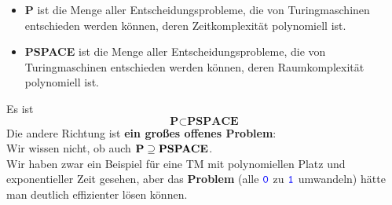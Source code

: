 \begin{frame}
	\begin{Definition}
	\begin{itemize}
		\item \textbf{P} ist die Menge aller Entscheidungsprobleme, die von Turingmaschinen entschieden werden können, deren Zeitkomplexität polynomiell ist.
		\item \textbf{PSPACE} ist die Menge aller Entscheidungsprobleme, die von Turingmaschinen entschieden werden können, deren Raumkomplexität polynomiell ist.
	\end{itemize}
	\end{Definition}
	\pause
	Es ist $$\textbf{P} \subset \textbf{PSPACE}$$ \pause
	Die andere Richtung ist \textbf{ein großes offenes Problem}:\\
	Wir wissen nicht, ob auch \qquad $\textbf{P} \supseteq \text{\bfseries PSPACE}$. \\
	Wir haben zwar ein Beispiel für eine TM mit polynomiellen Platz und exponentieller Zeit gesehen, aber das \textbf{Problem} (alle $\hbox{\textcolor{blue}{\texttt{0}}}$ zu $\hbox{\textcolor{blue}{\texttt{1}}}$ umwandeln) hätte man deutlich effizienter lösen können.
\end{frame}

